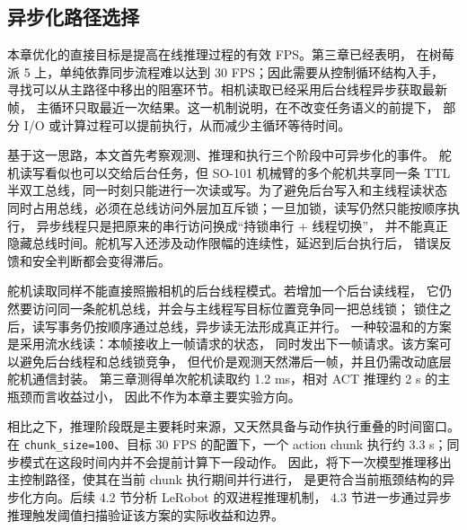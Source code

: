 \subsection{异步化路径选择}\label{sec:opt-motivation}\label{sec:async-feasibility}

本章优化的直接目标是提高在线推理过程的有效 FPS。第三章已经表明，
在树莓派 5 上，单纯依靠同步流程难以达到 30 FPS；因此需要从控制循环结构入手，
寻找可以从主路径中移出的阻塞环节。相机读取已经采用后台线程异步获取最新帧，
主循环只取最近一次结果。这一机制说明，在不改变任务语义的前提下，
部分 I/O 或计算过程可以提前执行，从而减少主循环等待时间。

基于这一思路，本文首先考察观测、推理和执行三个阶段中可异步化的事件。
舵机读写看似也可以交给后台任务，但 SO-101 机械臂的多个舵机共享同一条
TTL 半双工总线，同一时刻只能进行一次读或写。为了避免后台写入和主线程读状态
同时占用总线，必须在总线访问外层加互斥锁；一旦加锁，读写仍然只能按顺序执行，
异步线程只是把原来的串行访问换成``持锁串行 + 线程切换''，
并不能真正隐藏总线时间。舵机写入还涉及动作限幅的连续性，延迟到后台执行后，
错误反馈和安全判断都会变得滞后。

舵机读取同样不能直接照搬相机的后台线程模式。若增加一个后台读线程，
它仍然要访问同一条舵机总线，并会与主线程写目标位置竞争同一把总线锁；
锁住之后，读写事务仍按顺序通过总线，异步读无法形成真正并行。
一种较温和的方案是采用流水线读：本帧接收上一帧请求的状态，
同时发出下一帧请求。该方案可以避免后台线程和总线锁竞争，
但代价是观测天然滞后一帧，并且仍需改动底层舵机通信封装。
第三章测得单次舵机读取约 1.2 ms，相对 ACT 推理约 2 s 的主瓶颈而言收益过小，
因此不作为本章主要实验方向。

相比之下，推理阶段既是主要耗时来源，又天然具备与动作执行重叠的时间窗口。
在 \texttt{chunk\_size=100}、目标 30 FPS 的配置下，一个 action chunk
执行约 3.3 s；同步模式在这段时间内并不会提前计算下一段动作。
因此，将下一次模型推理移出主控制路径，使其在当前 chunk 执行期间并行进行，
是更符合当前瓶颈结构的异步化方向。后续 4.2 节分析 LeRobot 的双进程推理机制，
4.3 节进一步通过异步推理触发阈值扫描验证该方案的实际收益和边界。
